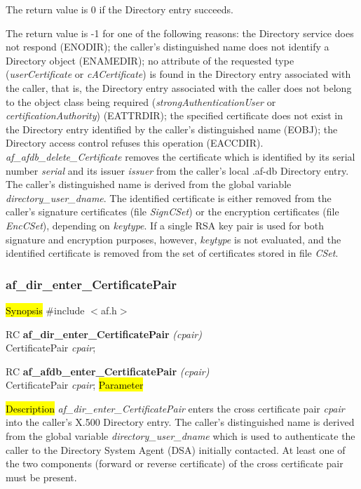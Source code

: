 The return value is 0 if the Directory entry succeeds.

The return value is -1 for one of the following reasons:
\bi
\m the Directory service does not respond (ENODIR);
\m the caller's distinguished name does not identify a Directory object (ENAMEDIR);
\m no attribute of the requested type ({\em userCertificate} or {\em cACertificate})
is found in the Directory entry associated with the caller, that is, the Directory entry
associated with the caller does not belong to the object class being required
({\em strongAuthenticationUser} or {\em certificationAuthority}) (EATTRDIR);
\m the specified certificate does not exist in the Directory entry 
identified by the caller's distinguished name (EOBJ);
\m the Directory access control refuses this operation (EACCDIR).
\ei
{\em af\_afdb\_delete\_Certificate} removes the certificate which is
identified by its serial number {\em serial} and its issuer {\em issuer} from the 
caller's local .af-db Directory entry. The caller's distinguished name is derived from
the global variable {\em directory\_user\_dname}. The identified certificate is either 
removed from the caller's signature certificates (file {\em SignCSet}) or the encryption
certificates (file {\em EncCSet}), depending on {\em keytype}. If a single RSA key pair is used for both signature and encryption purposes, however, {\em keytype} is not evaluated, and the identified certificate is removed from the set of certificates stored in file {\em CSet}.


\subsubsection{af\_dir\_enter\_CertificatePair}
\hl{Synopsis}
\#include $<$af.h$>$ 

RC {\bf af\_dir\_enter\_CertificatePair} {\em (cpair)} \\
CertificatePair {\em *cpair};

RC {\bf af\_afdb\_enter\_CertificatePair} {\em (cpair)} \\
CertificatePair {\em *cpair};
\hl{Parameter}

\hl{Description}
{\em af\_dir\_enter\_CertificatePair} enters the cross certificate pair {\em cpair} 
into the caller's X.500 Directory entry. The caller's distinguished name is derived from
the global variable {\em directory\_user\_dname} which is used to authenticate the caller to the
Directory System Agent (DSA) initially contacted. At least one of the two components 
(forward or reverse certificate) of the cross certificate pair must be present.

